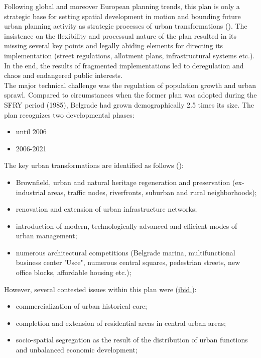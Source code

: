 \documentclass[11pt]{report}
\begin{document}
{{{{\begin{itemize}
Following global and moreover European planning trends, this plan is only a  strategic base for setting spatial development in motion and bounding future urban planning activity as strategic processes of urban transformations (\href{Grozdanic}{\citealt{grozdanic_belgrade_2008}}).
The insistence on the flexibility and processual nature of the plan resulted in its missing several key points and legally abiding elements for directing its implementation (street regulations,  allotment plans, infrastructural systems etc.).
In the end, the results of fragmented implementations led to deregulation and chaos and endangered public interests.
\\
The major technical challenge was the regulation of population growth and urban sprawl. Compared to circumstances when the former plan was adopted during the SFRY period (1985), Belgrade had grown demographically 2.5 times its size.
The plan recognizes two developmental phases:

\begin{itemize}
\item until 2006
\item 2006-2021
\end{itemize}

The key urban transformations are identified as follows (\href{Stupar}{\citealt{stupar_aleksandra_recreating_2004}}):
\begin{itemize}
\item Brownfield, urban and natural heritage regeneration and preservation (ex-industrial  areas,  traffic  nodes, riverfronts,  suburban  and  rural neighborhoods);
\item renovation and extension of urban infrastructure networks;
\item introduction  of  modern, technologically  advanced  and  efficient  modes  of  urban management;
\item numerous  architectural  competitions (Belgrade marina, multifunctional business center 'Usce", numerous central squares, pedestrian streets, new office blocks, affordable housing etc.);
\end{itemize}

However, several contested issues within this plan were (\href{ref}{ibid.}):
\begin{itemize}
\item commercialization  of  urban  historical core;
\item completion and extension of residential  areas in central urban areas;
\item socio-spatial segregation as the result of the distribution of urban functions and unbalanced economic development;
\end{itemize}


\end{itemize}}}}}
\end{document}
